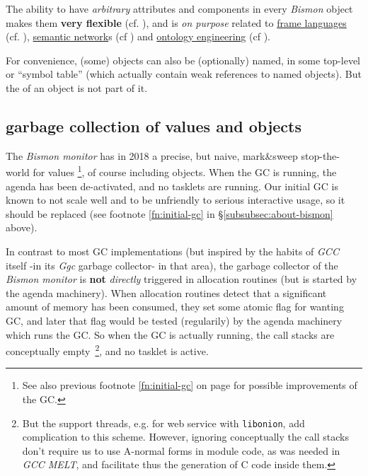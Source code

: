 The ability to have \emph{arbitrary} attributes and components in
every \emph{Bismon} object makes them \textbf{very flexible}
(cf. \cite{Lenat:1983:Eurisko, Lenat:1991:ev-cycl}), and is \emph{on purpose}
related to \href{https://en.wikipedia.org/wiki/Frame\_language}{frame
  languages} (cf. \cite{Bobrow-Winograd:1977:KRL}),
\href{https://en.wikipedia.org/wiki/Semantic\_network}{semantic
  network}s (cf \cite{VanDeRiet:1992:Ling-instr-know}) and
\href{https://en.wikipedia.org/wiki/Ontology\_engineering}{ontology
  engineering} (cf \cite{DeNicola:2009:OntologyBuilding}).

\medskip

For convenience, (some) objects can also be (optionally) named, in
some top-level  or ``symbol
table'' (which actually contain weak references to named objects). But
the  of an object is not part of it.

\bigskip

\subsection{garbage collection of values and objects}
\label{subsec:gcvalobj}

The \emph{Bismon monitor} has in 2018 a precise, but naive,
mark\&sweep stop-the-world  for values \footnote{See also previous footnote
  \ref{fn:initial-gc} on page \pageref{fn:initial-gc} for possible
  improvements of the GC.}, of course including objects. When the GC
is running, the agenda has been de-activated, and no tasklets are
running. Our initial GC is known to not scale well and to be
unfriendly to serious interactive usage, so it should be replaced (see
footnote \ref{fn:initial-gc} in §\ref{subsubsec:about-bismon} above).

In contrast to most GC implementations (but inspired by the habits of
\emph{GCC} itself -in its \emph{Ggc} garbage collector- in that area),
the garbage collector of the \emph{Bismon monitor} is \textbf{not}
\emph{directly} triggered in allocation routines (but is started by
the agenda machinery). When allocation routines detect that a
significant amount of memory has been consumed, they set some atomic
flag for wanting GC, and later that flag would be tested (regularily)
by the agenda machinery which runs the GC.  So when the GC is actually
running, the call stacks are conceptually empty~\footnote{But the
  support threads, e.g. for web service with \texttt{libonion}, add
  complication to this scheme. However, ignoring conceptually the call
  stacks don't require us to use A-normal forms in module code, as was
  needed in \emph{GCC MELT}, and facilitate thus the generation of C
  code inside them.}, and no tasklet is active.


